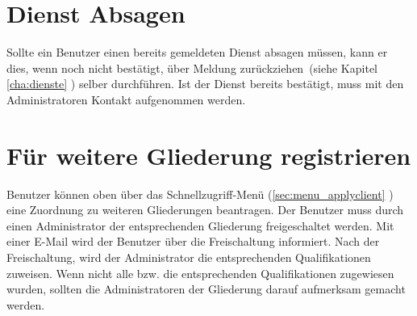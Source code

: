 \section{Dienst Absagen}
\label{sec:process_service_cancel}
Sollte ein Benutzer einen bereits gemeldeten Dienst absagen müssen, kann er dies, wenn noch nicht bestätigt, über \glqq Meldung zurückziehen\grqq ~(siehe Kapitel \ref{cha:dienste} ) selber durchführen. Ist der Dienst bereits bestätigt, muss mit den Administratoren Kontakt aufgenommen werden.

\section{Für weitere Gliederung registrieren}
\label{sec:process_apply_client}
Benutzer können oben über das Schnellzugriff-Menü (\ref{sec:menu_applyclient} ) eine Zuordnung zu weiteren Gliederungen beantragen. Der Benutzer muss durch einen Administrator der entsprechenden Gliederung freigeschaltet werden. Mit einer E-Mail wird der Benutzer über die Freischaltung informiert. Nach der Freischaltung, wird der Administrator die entsprechenden Qualifikationen zuweisen. Wenn nicht alle bzw. die entsprechenden Qualifikationen zugewiesen wurden, sollten die Administratoren der Gliederung darauf aufmerksam gemacht werden.
